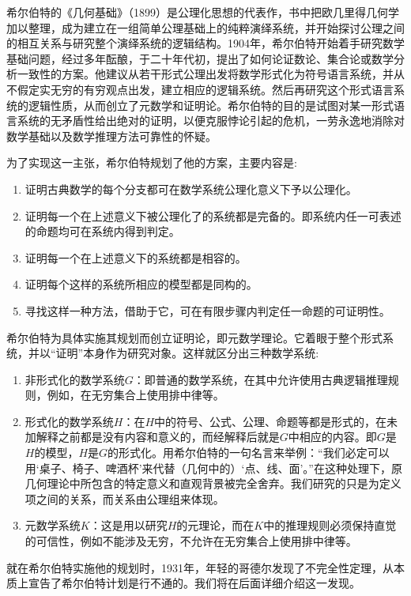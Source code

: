 \documentclass{article}
\begin{document}
希尔伯特的《几何基础》（1899）是公理化思想的代表作，书中把欧几里得几何学加以整理，成为建立在一组简单公理基础上的纯粹演绎系统，并开始探讨公理之间的相互关系与研究整个演绎系统的逻辑结构。1904年，希尔伯特开始着手研究数学基础问题，经过多年酝酿，于二十年代初，提出了如何论证数论、集合论或数学分析一致性的方案。他建议从若干形式公理出发将数学形式化为符号语言系统，并从不假定实无穷的有穷观点出发，建立相应的逻辑系统。然后再研究这个形式语言系统的逻辑性质，从而创立了元数学和证明论。希尔伯特的目的是试图对某一形式语言系统的无矛盾性给出绝对的证明，以便克服悖论引起的危机，一劳永逸地消除对数学基础以及数学推理方法可靠性的怀疑。

为了实现这一主张，希尔伯特规划了他的方案，主要内容是:
\begin{enumerate}
\item 证明古典数学的每个分支都可在数学系统公理化意义下予以公理化。
\item 证明每一个在上述意义下被公理化了的系统都是完备的。即系统内任一可表述的命题均可在系统内得到判定。
\item 证明每一个在上述意义下的系统都是相容的。
\item 证明每个这样的系统所相应的模型都是同构的。
\item 寻找这样一种方法，借助于它，可在有限步骤内判定任一命题的可证明性。
\end{enumerate}

希尔伯特为具体实施其规划而创立证明论，即元数学理论。它着眼于整个形式系统，并以“证明”本身作为研究对象。这样就区分出三种数学系统:
\begin{enumerate}
\item 非形式化的数学系统$G$：即普通的数学系统，在其中允许使用古典逻辑推理规则，例如，在无穷集合上使用排中律等。
\item 形式化的数学系统$H$：在$H$中的符号、公式、公理、命题等都是形式的，在未加解释之前都是没有内容和意义的，而经解释后就是$G$中相应的内容。即$G$是$H$的模型，$H$是$G$的形式化。用希尔伯特的一句名言来举例：“我们必定可以用‘桌子、椅子、啤酒杯’来代替（几何中的）‘点、线、面’。”在这种处理下，原几何理论中所包含的特定意义和直观背景被完全舍弃。我们研究的只是为定义项之间的关系，而关系由公理组来体现。
\item 元数学系统$K$：这是用以研究$H$的元理论，而在$K$中的推理规则必须保持直觉的可信性，例如不能涉及无穷，不允许在无穷集合上使用排中律等。
\end{enumerate}

就在希尔伯特实施他的规划时，1931年，年轻的哥德尔发现了不完全性定理，从本质上宣告了希尔伯特计划是行不通的。我们将在后面详细介绍这一发现。
\end{document}
